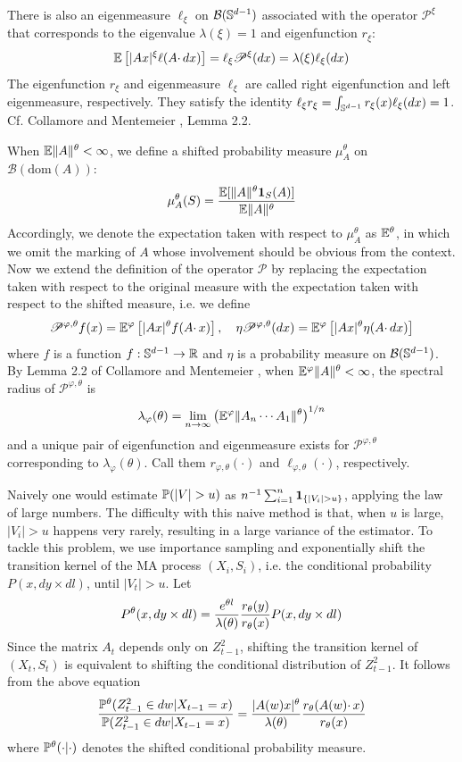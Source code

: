 \documentclass[aoas,preprint]{imsart}
\numberwithin{equation}{section}
\theoremstyle{plain}
\begin{document}
There is also an eigenmeasure $\ell_\xi$ on $\mathcal B(\sphere^{d-1})$
associated with the operator
$\mathscr P^\xi$ that corresponds to the eigenvalue
$\lambda(\xi) = 1$ and eigenfunction $r_\xi$:
\[
\E \left[ |A x|^\xi \ell(A \cdotp dx) \right]
= \ell_\xi \mathscr P^\xi (dx)
= \lambda(\xi) \ell_\xi(dx)
\]
The eigenfunction $r_\xi$ and eigenmeasure $\ell_\xi$ are called
right eigenfunction and left eigenmeasure, respectively. They
satisfy the identity
$\ell_\xi r_\xi = \int_{\sphere^{d-1}} r_\xi(x) \ell_\xi(dx) = 1$.
Cf. Collamore and Mentemeier \cite{collamore:mentemeier:2016},
Lemma 2.2.

When $\E \|A\|^\theta < \infty$, we define a shifted probability
measure $\mu_A^\theta$ on $\mathcal B(\text{dom}(A))$:
\[
\mu_A^\theta(S) = {
  \E [ \| A \|^\theta \I_S(A)]
  \over
  \E \|A\|^\theta
}
\]
Accordingly, we denote the expectation taken with respect to
$\mu_A^\theta$ as $\E^\theta$, in which we omit the marking of $A$
whose involvement should be obvious from the context.
Now we extend the definition of the operator $\mathscr P$ by replacing
the expectation taken with respect to the original measure with the
expectation taken with respect to the shifted measure, i.e. we
define
\[
\mathscr P^{\varphi, \theta} f(x)
= \E^\varphi \left[
  |A x|^\theta f(A \cdotp x)
\right], \quad
\eta \mathscr P^{\varphi, \theta}(dx)
=
\E^\varphi \left[ |A x|^\theta \eta(A \cdotp dx) \right]
\]
where $f$ is a function $f: \sphere^{d-1} \to \reals$ and
$\eta$ is a probability measure on $\mathcal B(\sphere^{d-1})$.
By Lemma 2.2 of Collamore and Mentemeier
\cite{collamore:mentemeier:2016}, when
$\E^\varphi \| A \|^\theta < \infty$, the spectral radius of
$\mathscr P^{\varphi, \theta}$ is
\[
\lambda_\varphi(\theta) = \lim_{n \to \infty}
\left(\E^\varphi \|A_n \cdots A_1 \|^\theta\right)^{1/n}
\]
and a unique pair of eigenfunction and eigenmeasure exists
for $\mathscr P^{\varphi, \theta}$ corresponding to
$\lambda_\varphi(\theta)$. Call them
$r_{\varphi, \theta}(\cdot)$ and $\ell_{\varphi, \theta}(\cdot)$,
respectively.

Naively one would estimate $\P(|V| > u)$ as
$n^{-1} \sum_{i=1}^n \1{|V_i| > u}$, applying the law of large
numbers. The difficulty with this naive method is that, when $u$ is
large, $|V_i| > u$ happens very rarely, resulting in a large variance
of the estimator. To tackle this problem, we use importance sampling
and exponentially shift the transition kernel of the MA process
$(X_i, S_i)$, i.e. the conditional probability $P(x, dy \times dl)$,
until $|V_t| > u$. Let
\[
P^\theta(x, dy \times dl)
=
{e^{\theta l} \over \lambda(\theta)}
{r_\theta(y) \over r_\theta(x)}
P(x, dy \times dl)
\]
Since the matrix $A_t$ depends only on $Z_{t-1}^2$, shifting the
transition kernel of $(X_t, S_t)$ is equivalent to shifting the
conditional distribution of $Z_{t-1}^2$. It follows from the above
equation
\[
{
  \P^\theta(Z_{t-1}^2 \in dw | X_{t-1} = x)
  \over
  \P(Z_{t-1}^2 \in dw | X_{t-1} = x)
} = {|A(w) x|^\theta \over \lambda(\theta)}
{
  r_\theta (A(w) \cdotp x)
  \over
  r_\theta(x)
}
\]
where $\P^\theta(\cdot | \cdot)$ denotes the shifted conditional
probability measure.
\end{document}
